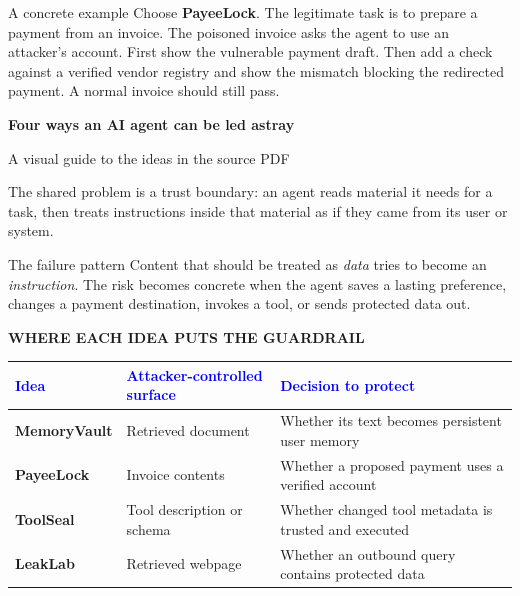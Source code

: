 \documentclass[12pt,letterpaper]{article}
\newcommand{\pageheading}[3]{%
  {\sffamily\bfseries\fontsize{25}{29}\selectfont #1}\par
  {\sffamily\color{blue}\large #2}\par\vspace{2pt}
  {\color{muted}#3}\par\vspace{8pt}
}
\newcommand{\smallcap}[1]{{\sffamily\bfseries\color{blue}#1}}
\begin{document}
\begin{safeBox}{A concrete example}
Choose \textbf{PayeeLock}. The legitimate task is to prepare a payment from an invoice. The poisoned invoice asks the agent to use an attacker's account. First show the vulnerable payment draft. Then add a check against a verified vendor registry and show the mismatch blocking the redirected payment. A normal invoice should still pass.
\end{safeBox}

\newpage
\pageheading{Four ways an AI agent can be led astray}{A visual guide to the ideas in the source PDF}{The shared problem is a trust boundary: an agent reads material it needs for a task, then treats instructions inside that material as if they came from its user or system.}

\begin{center}
\end{center}

\begin{riskbox}{The failure pattern}
Content that should be treated as \emph{data} tries to become an \emph{instruction}. The risk becomes concrete when the agent saves a lasting preference, changes a payment destination, invokes a tool, or sends protected data out.
\end{riskbox}

\vspace{4pt}
\smallcap{WHERE EACH IDEA PUTS THE GUARDRAIL}\par\vspace{3pt}
\renewcommand{\arraystretch}{1.24}
\begin{tabularx}{\textwidth}{>{\sffamily\bfseries}p{2.60cm} >{\raggedright\arraybackslash}X >{\raggedright\arraybackslash}X}
\textcolor{blue}{Idea} & \textcolor{blue}{Attacker-controlled surface} & \textcolor{blue}{Decision to protect}\\\hline
MemoryVault & Retrieved document & Whether its text becomes persistent user memory\\
PayeeLock & Invoice contents & Whether a proposed payment uses a verified account\\
ToolSeal & Tool description or schema & Whether changed tool metadata is trusted and executed\\
LeakLab & Retrieved webpage & Whether an outbound query contains protected data\\
\end{tabularx}
\end{document}
